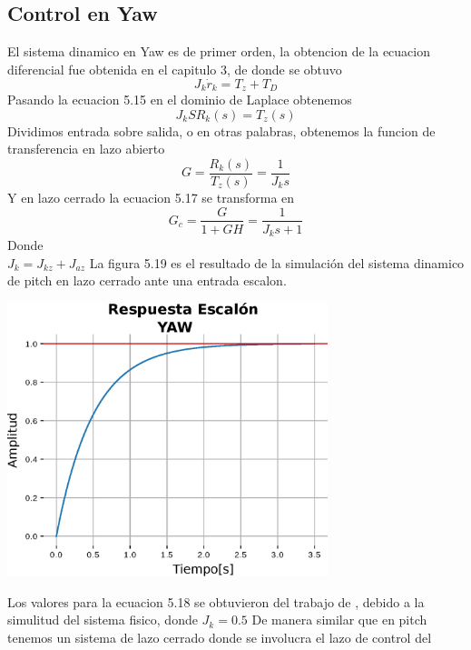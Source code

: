 \subsection{Control en Yaw}
El sistema dinamico en Yaw es de primer orden, la obtencion de la ecuacion diferencial 
fue obtenida en el capitulo 3, de donde se obtuvo
\begin{equation}
	J_k\dot{r}_k = T_z+T_D
\end{equation}
Pasando la ecuacion 5.15 en el dominio de Laplace obtenemos
\begin{equation}
	J_{k}SR_k(s) = T_z(s)
\end{equation}
Dividimos entrada sobre salida, o en otras palabras, obtenemos la funcion de transferencia en lazo abierto
\begin{equation}
	G = \frac{R_k(s)}{T_z(s)} =  \frac{1}{J_{k}s}
\end{equation}
Y en lazo cerrado la ecuacion 5.17 se transforma en 
\begin{equation}
	G_c = \frac{G}{1 +GH} = \frac{1}{J_{k}s+1}
\end{equation}
Donde \\
$J_k = J_{kz} + J_{az} $ 
La figura 5.19 es el resultado de la simulación del sistema dinamico de pitch en lazo cerrado ante una entrada escalon.
\begin{center}
	\includegraphics[width=0.7\textwidth]{Contenido/Cuerpo/Capitulo5/Fig29.eps}
	\label{Fig4}
\end{center}
Los valores para la ecuacion 5.18 se obtuvieron del trabajo de \cite{Paper::Abdo2013}, debido a la simulitud del sistema fisico, donde 
$J_{k} = 0.5$ 
De manera similar que en pitch tenemos un sistema de lazo cerrado donde se involucra el lazo de control del 
